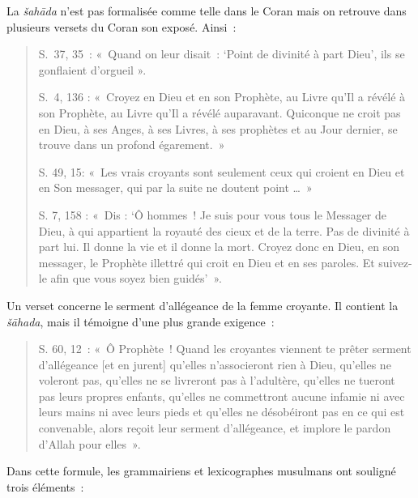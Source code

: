 La \emph{šahāda} n'est pas formalisée comme telle dans le Coran mais on
retrouve dans plusieurs versets du Coran son exposé. Ainsi~:
\begin{quote}
    

S.~37, 35~: «~Quand on leur disait~: `Point de divinité à part Dieu',
ils se gonflaient d'orgueil ».

S.~4, 136 : «~Croyez en Dieu et en son Prophète, au Livre qu'Il a révélé
à son Prophète, au Livre qu'Il a révélé auparavant. Quiconque ne croit
pas en Dieu, à ses Anges, à ses Livres, à ses prophètes et au Jour
dernier, se trouve dans un profond égarement.~»

S. 49, 15: «~Les vrais croyants sont seulement ceux qui croient en Dieu
et en Son messager, qui par la suite ne doutent point \ldots~»

S. 7, 158 : «~Dis : `Ô hommes~! Je suis pour vous tous le Messager de
Dieu, à qui appartient la royauté des cieux et de la terre. Pas de
divinité à part lui. Il donne la vie et il donne la mort. Croyez donc en
Dieu, en son messager, le Prophète illettré qui croit en Dieu et en ses
paroles. Et suivez-le afin que vous soyez bien guidés'~».
\end{quote}
Un verset concerne le serment d'allégeance de la femme croyante. Il
contient la \emph{šāhada}, mais il témoigne d'une plus grande exigence~:
\begin{quote}
    

S. 60, 12~: «~Ô Prophète~! Quand les croyantes viennent te prêter
serment d'allégeance {[}et en jurent{]} qu'elles n'associeront rien à
Dieu, qu'elles ne voleront pas, qu'elles ne se livreront pas à
l'adultère, qu'elles ne tueront pas leurs propres enfants, qu'elles ne
commettront aucune infamie ni avec leurs mains ni avec leurs pieds et
qu'elles ne désobéiront pas en ce qui est convenable, alors reçoit leur
serment d'allégeance, et implore le pardon d'Allah pour elles~».
\end{quote}


Dans cette formule, les grammairiens et lexicographes musulmans ont
souligné trois éléments~:

